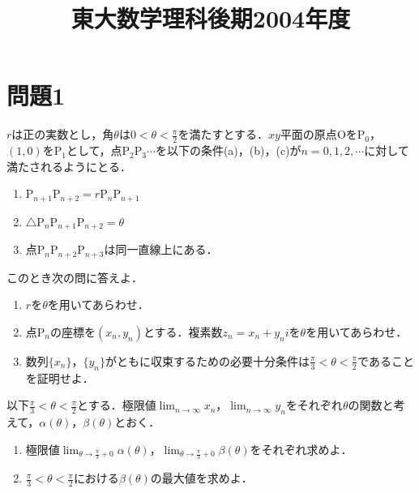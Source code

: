\documentclass[unicode,12pt, A4j]{ltjsarticle}%
\title{東大数学理科後期2004年度}
\author{}
\date{}
\begin{document}
\maketitle

\section{問題1}
$r$は正の実数とし，角$\theta$は$0<\theta<\frac{\pi}{2}$を満たすとする．$xy$平面の原点$\mathrm{O}$を$\mathrm{P}_0$，$(1,0)$を$\mathrm{P}_1$として，点$\mathrm{P}_2\mathrm{P}_3\cdots$を以下の条件(a)，(b)，(c)が$n=0,1,2,\cdots$に対して満たされるようにとる．
 \begin{enumerate}
  \item $\mathrm{P}_{n+1}\mathrm{P}_{n+2}=r\mathrm{P}_{n}\mathrm{P}_{n+1}$
  \item $\triangle \mathrm{P}_{n}\mathrm{P}_{n+1}\mathrm{P}_{n+2}=\theta$
  \item 点$\mathrm{P}_n\mathrm{P}_{n+2}\mathrm{P}_{n+3}$は同一直線上にある．
 \end{enumerate}
このとき次の問に答えよ．
 \begin{enumerate}
  \item $r$を$\theta$を用いてあらわせ．
  \item 点$\mathrm{P}_n$の座標を$(x_n,y_n)$とする．複素数$z_n=x_n+y_ni$を$\theta$を用いてあらわせ．
  \item 数列$\{x_n\}$，$\{y_n\}$がともに収束するための必要十分条件は$\frac{\pi}{3}<\theta<\frac{\pi}{2}$であることを証明せよ．
 \end{enumerate}
以下$\frac{\pi}{3}<\theta<\frac{\pi}{2}$とする．極限値$\lim_{n\to\infty}x_n$，$\lim_{n\to\infty}y_n$をそれぞれ$\theta$の関数と考えて，$\alpha(\theta)$，$\beta(\theta)$とおく．
\begin{enumerate}
 \item 極限値$\lim_{\theta\to{\frac{\pi}{3}+0}}\alpha(\theta)$，$\lim_{\theta\to{\frac{\pi}{3}+0}}\beta(\theta)$をそれぞれ求めよ．
 \item $\frac{\pi}{3}<\theta<\frac{\pi}{2}$における$\beta(\theta)$の最大値を求めよ．
\end{enumerate}
\end{document}
